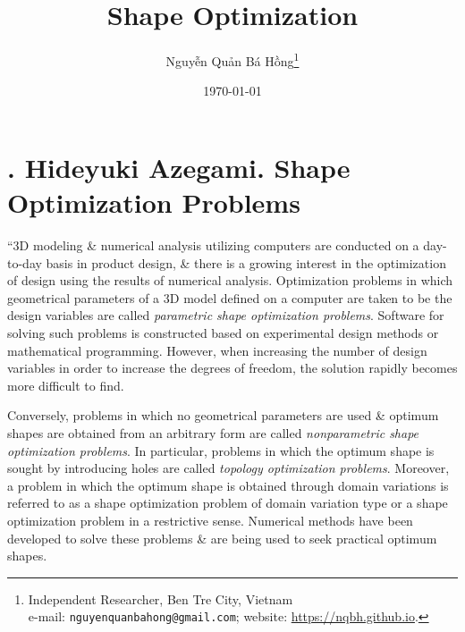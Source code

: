 \documentclass[oneside]{book}
\title{Shape Optimization}
\author{\selectlanguage{vietnamese} Nguyễn Quản Bá Hồng\footnote{Independent Researcher, Ben Tre City, Vietnam\\e-mail: \texttt{nguyenquanbahong@gmail.com}; website: \url{https://nqbh.github.io}.}}
\date{\today}
\numberwithin{equation}{section}
\begin{document}
\maketitle
\setcounter{secnumdepth}{4}
\setcounter{tocdepth}{4}
\tableofcontents


\chapter{\cite{Azegami2020}. Hideyuki Azegami. Shape Optimization Problems}
``3D modeling \& numerical analysis utilizing computers are conducted on a day-to-day basis in product design, \& there is a growing interest in the optimization of design using the results of numerical analysis. Optimization problems in which geometrical parameters of a 3D model defined on a computer are taken to be the design variables are called \textit{parametric shape optimization problems}. Software for solving such problems is constructed based on experimental design methods or mathematical programming. However, when increasing the number of design variables in order to increase the degrees of freedom, the solution rapidly becomes more difficult to find.

Conversely, problems in which no geometrical parameters are used \& optimum shapes are obtained from an arbitrary form are called \textit{nonparametric shape optimization problems}. In particular, problems in which the optimum shape is sought by introducing holes are called \textit{topology optimization problems}. Moreover, a problem in which the optimum shape is obtained through domain variations is referred to as a shape optimization problem of domain variation type or a shape optimization problem in a restrictive sense. Numerical methods have been developed to solve these problems \& are being used to seek practical optimum shapes.
\end{document}
